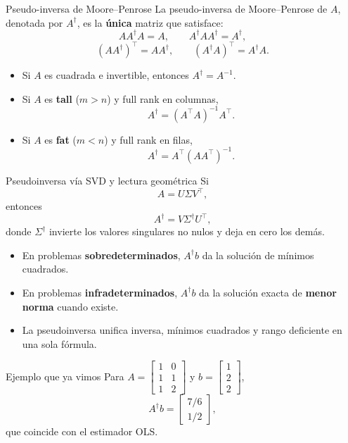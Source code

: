 \begin{frame}{Pseudo-inversa de Moore--Penrose}
La pseudo-inversa de Moore--Penrose de $A$, denotada por $A^\dagger$, es la \textbf{única} matriz que satisface:
\[
AA^\dagger A = A,
\qquad
A^\dagger A A^\dagger = A^\dagger,
\]
\[
(AA^\dagger)^\top = AA^\dagger,
\qquad
(A^\dagger A)^\top = A^\dagger A.
\]
\vspace{0.25em}
\begin{itemize}\small
  \item Si $A$ es cuadrada e invertible, entonces $A^\dagger=A^{-1}$.
  \item Si $A$ es \textbf{tall} ($m>n$) y full rank en columnas,
  \[
    A^\dagger=(A^\top A)^{-1}A^\top.
  \]
  \item Si $A$ es \textbf{fat} ($m<n$) y full rank en filas,
  \[
    A^\dagger=A^\top(AA^\top)^{-1}.
  \]
\end{itemize}
\end{frame}

\begin{frame}{Pseudoinversa vía SVD y lectura geométrica}
\small
\vspace{-0.2em}
Si
\[
  A=U\Sigma V^\top,
\]
\vspace{-0.35em}
entonces
\[
  A^\dagger = V\Sigma^\dagger U^\top,
\]
\vspace{-0.35em}
{\footnotesize donde $\Sigma^\dagger$ invierte los valores singulares no nulos y deja en cero los demás.}
\begin{itemize}\footnotesize
  \setlength{\itemsep}{0.15em}
  \item En problemas \textbf{sobredeterminados}, $A^\dagger b$ da la solución de mínimos cuadrados.
  \item En problemas \textbf{infradeterminados}, $A^\dagger b$ da la solución exacta de \textbf{menor norma} cuando existe.
  \item La pseudoinversa unifica inversa, mínimos cuadrados y rango deficiente en una sola fórmula.
\end{itemize}
\vspace{-0.2em}
\begin{block}{Ejemplo que ya vimos}
\footnotesize
Para $A=\begin{bmatrix}1&0\\1&1\\1&2\end{bmatrix}$ y $b=\begin{bmatrix}1\\2\\2\end{bmatrix}$,
\[
  A^\dagger b = \begin{bmatrix}7/6\\1/2\end{bmatrix},
\]
que coincide con el estimador OLS.
\end{block}
\end{frame}

